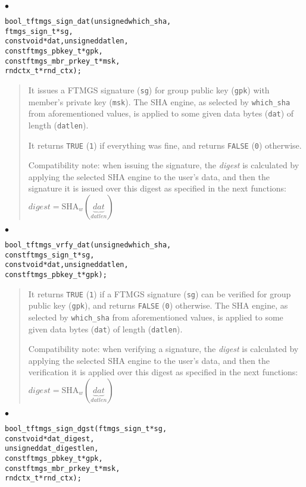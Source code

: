 \documentclass[a4paper]{article}
\newenvironment{api}%
{\noindent$\bullet$\hfill\begin{minipage}[t]{0.97\linewidth}\footnotesize\begin{alltt}}%
{\end{alltt}\end{minipage}}%
\begin{document}
\begin{api}
bool_t ftmgs_sign_dat(unsigned which_sha,
                     ftmgs_sign_t* sg,
                     const void* dat, unsigned datlen,
                     const ftmgs_pbkey_t* gpk,
                     const ftmgs_mbr_prkey_t* msk,
                     rndctx_t* rnd_ctx);
\end{api}
\begin{quote}\footnotesize
It issues a FTMGS signature (\verb|sg|) for group public key
(\verb|gpk|) with member's private key (\verb|msk|). The SHA engine,
as selected by \verb|which_sha| from aforementioned values, is applied
to some given data bytes (\verb|dat|) of length (\verb|datlen|).

It returns \verb|TRUE| (\verb|1|) if everything was fine, and returns
\verb|FALSE| (\verb|0|) otherwise.

Compatibility note: when issuing the signature, the \emph{digest} is
calculated by applying the selected SHA engine to the user's data, and
then the signature it is issued over this digest as specified in
the next functions:\\
{$\mathit{digest} = \mathrm{SHA}_w(\underbrace{\mathit{dat}}_{\mathit{datlen}})$}
\end{quote}
\begin{api}
bool_t ftmgs_vrfy_dat(unsigned which_sha,
                      const ftmgs_sign_t* sg,
                      const void* dat, unsigned datlen,
                      const ftmgs_pbkey_t* gpk);
\end{api}
\begin{quote}\footnotesize
It returns \verb|TRUE| (\verb|1|) if a FTMGS signature (\verb|sg|) can
be verified for group public key (\verb|gpk|), and returns
\verb|FALSE| (\verb|0|) otherwise. The SHA engine, as selected by
\verb|which_sha| from aforementioned values, is applied to some given
data bytes (\verb|dat|) of length (\verb|datlen|).

Compatibility note: when verifying a signature, the \emph{digest} is
calculated by applying the selected SHA engine to the user's data, and
then the verification it is applied over this digest as specified in
the next functions:\\
{$\mathit{digest} = \mathrm{SHA}_w(\underbrace{\mathit{dat}}_{\mathit{datlen}})$}
\end{quote}
\begin{api}
bool_t ftmgs_sign_dgst(ftmgs_sign_t* sg,
                      const void* dat_digest,
                      unsigned dat_digestlen,
                      const ftmgs_pbkey_t* gpk,
                      const ftmgs_mbr_prkey_t* msk,
                      rndctx_t* rnd_ctx);
\end{api}
\end{document}
